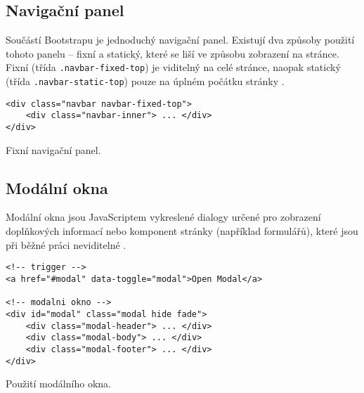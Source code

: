 \subsection{Navigační panel}

Součástí Bootstrapu je jednoduchý navigační panel. Existují dva způsoby použití tohoto panelu -- fixní a statický, které se liší ve způsobu zobrazení na stránce. Fixní (třída \texttt{.navbar-fixed-top}) je viditelný na celé stránce, naopak statický (třída \texttt{.navbar-static-top}) pouze na úplném počátku stránky \cite{19}.

\begin{example}
    \centering
    \begin{lstlisting}
<div class="navbar navbar-fixed-top">
    <div class="navbar-inner"> ... </div>
</div>
    \end{lstlisting}
    \caption{Fixní navigační panel.}
    \label{example:form}
\end{example}

\subsection{Modální okna}

Modální okna jsou JavaScriptem vykreslené dialogy určené pro zobrazení doplňkových informací nebo komponent stránky (například formulářů), které jsou při běžné práci neviditelné \cite{19}.

\begin{example}
    \centering
    \begin{lstlisting}[language=html5]
<!-- trigger -->
<a href="#modal" data-toggle="modal">Open Modal</a>

<!-- modalni okno -->
<div id="modal" class="modal hide fade">
    <div class="modal-header"> ... </div>
    <div class="modal-body"> ... </div>
    <div class="modal-footer"> ... </div>
</div>
    \end{lstlisting}
    \caption{Použití modálního okna.}
    \label{example:form}
\end{example}
